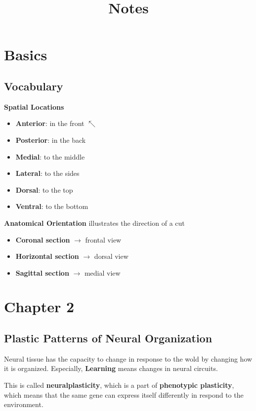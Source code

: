 \documentclass{article}
\title{Notes}
\begin{document}
\maketitle
\section{Basics}

\subsection{Vocabulary}

\textbf{Spatial Locations}
\begin{itemize}
\item {
    \textbf{Anterior}: in the front \(\nwarrow\)
}\item {
    \textbf{Posterior}: in the back
}\item {
    \textbf{Medial}: to the middle
}\item {
    \textbf{Lateral}: to the sides
}\item {
    \textbf{Dorsal}: to the top
}\item {
    \textbf{Ventral}: to the bottom
}
\end{itemize}

\noindent
\textbf{Anatomical Orientation}
illustrates the direction of a cut
\begin{itemize}
\item {
    \textbf{Coronal section} \(\rightarrow\) frontal view
}\item {
    \textbf{Horizontal section} \(\rightarrow\) dorsal view
}\item {
    \textbf{Sagittal section} \(\rightarrow\) medial view
}
\end{itemize}





\section{Chapter 2}
\subsection{Plastic Patterns of Neural Organization}
Neural tissue has the capacity to change in response to the wold by changing how it is organized. Especially, \textbf{Learning} means changes in neural circuits.

This is called \textbf{neuralplasticity}, which is a part of \textbf{phenotypic plasticity}, which means that the same gene can express itself differently in respond to the environment.
\end{document}
